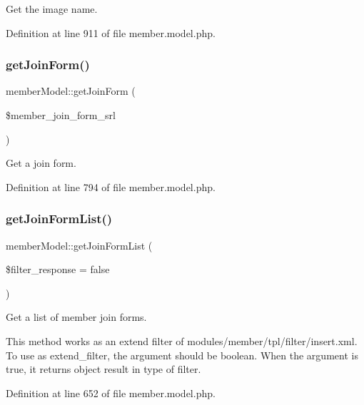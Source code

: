 Get the image name. 



Definition at line 911 of file member.\+model.\+php.

\mbox{\label{classmemberModel_ad4ecb6428f8ccea4369bb7535464570e}} 
\subsubsection{\texorpdfstring{get\+Join\+Form()}{getJoinForm()}}
{\footnotesize\ttfamily member\+Model\+::get\+Join\+Form (\begin{DoxyParamCaption}\item[{}]{\$member\+\_\+join\+\_\+form\+\_\+srl }\end{DoxyParamCaption})}



Get a join form. 



Definition at line 794 of file member.\+model.\+php.

\mbox{\label{classmemberModel_af8d32c782e4637661e9379acb8ee96b1}} 
\subsubsection{\texorpdfstring{get\+Join\+Form\+List()}{getJoinFormList()}}
{\footnotesize\ttfamily member\+Model\+::get\+Join\+Form\+List (\begin{DoxyParamCaption}\item[{}]{\$filter\+\_\+response = {\ttfamily false} }\end{DoxyParamCaption})}



Get a list of member join forms. 

This method works as an extend filter of modules/member/tpl/filter/insert.\+xml. To use as extend\+\_\+filter, the argument should be boolean. When the argument is true, it returns object result in type of filter. 

Definition at line 652 of file member.\+model.\+php.

\mbox{\label{classmemberModel_a80179b6ef63e1917514c098df24c6e93}} 

